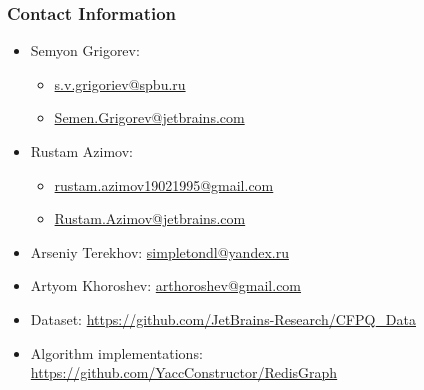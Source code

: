 \documentclass[xcolor=table]{beamer}
\begin{document}
\begin{frame}
\frametitle{Contact Information}
\begin{itemize}
  \item Semyon Grigorev:
    \begin{itemize}
      \item \href{mailto:s.v.grigoriev@spbu.ru}{s.v.grigoriev@spbu.ru}
      \item \href{mailto:Semen.Grigorev@jetbrains.com}{Semen.Grigorev@jetbrains.com}
    \end{itemize}
  \item Rustam Azimov:
  \begin{itemize}
  	\item \href{mailto:rustam.azimov19021995@gmail.com}{rustam.azimov19021995@gmail.com}
  	\item \href{mailto:Rustam.Azimov@jetbrains.com}{Rustam.Azimov@jetbrains.com}
  \end{itemize}
  \item Arseniy Terekhov: \href{mailto:simpletondl@yandex.ru}{simpletondl@yandex.ru}
  \item Artyom Khoroshev: \href{mailto:arthoroshev@gmail.com}{arthoroshev@gmail.com}
\vspace{0.5cm}
  \item Dataset: \href{https://github.com/JetBrains-Research/CFPQ_Data}{https://github.com/JetBrains-Research/CFPQ\_Data}
   \item Algorithm implementations: \href{https://github.com/YaccConstructor/RedisGraph}{https://github.com/YaccConstructor/RedisGraph}
\end{itemize}
\vspace{0.1cm}
\end{frame}
\end{document}
